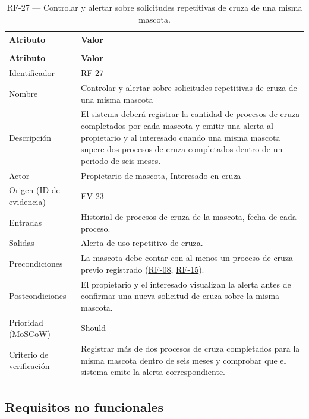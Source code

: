 \documentclass[journal,onecolumn]{IEEEtran}
\makeatletter
\newenvironment{atributos}[2]{%
	\small
	\begin{longtable}{@{}>{\raggedright\arraybackslash}p{4.2cm} >{\raggedright\arraybackslash}p{11.2cm}@{}}
		\caption{#2}\label{tab:#1}\\
		\toprule
		\textbf{Atributo} & \textbf{Valor} \\
		\midrule
		\endfirsthead
		\multicolumn{2}{@{}l}{\small\itshape (continuación)}\\
		\toprule
		\textbf{Atributo} & \textbf{Valor} \\
		\midrule
		\endhead
		\bottomrule
		\endlastfoot
	}{%
	\end{longtable}
	\normalsize
}
\makeatother
\begin{document}
	\begin{atributos}{RF-27}{RF-27 --- Controlar y alertar sobre solicitudes repetitivas de cruza de una misma mascota.}
		Identificador & \hyperref[tab:RF-27]{RF-27} \\
		Nombre & Controlar y alertar sobre solicitudes repetitivas de cruza de una misma mascota \\
		Descripción & El sistema deberá registrar la cantidad de procesos de cruza completados por cada mascota y emitir una alerta al propietario y al interesado cuando una misma mascota supere dos procesos de cruza completados dentro de un periodo de seis meses. \\
		Actor & Propietario de mascota, Interesado en cruza \\
		Origen (ID de evidencia) & EV-23 \\
		Entradas & Historial de procesos de cruza de la mascota, fecha de cada proceso. \\
		Salidas & Alerta de uso repetitivo de cruza. \\
		Precondiciones & La mascota debe contar con al menos un proceso de cruza previo registrado (\hyperref[tab:RF-08]{RF-08}, \hyperref[tab:RF-15]{RF-15}). \\
		Postcondiciones & El propietario y el interesado visualizan la alerta antes de confirmar una nueva solicitud de cruza sobre la misma mascota. \\
		Prioridad (MoSCoW) & Should \\
		Criterio de verificación & Registrar más de dos procesos de cruza completados para la misma mascota dentro de seis meses y comprobar que el sistema emite la alerta correspondiente. \\
	\end{atributos}
	\subsection{Requisitos no funcionales}
	\label{sec:rnf}
	
\end{document}
